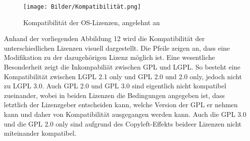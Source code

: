 \begin{figure}[h]
    \centering
    \texttt{[image: Bilder/Kompatibilität.png]}
    \caption{Kompatibilität der OS-Lizenzen, angelehnt an \cite[S. 65]{schaaf_open-source-lizenzen_2013}}
\end{figure}

Anhand der vorliegenden Abbildung 12 wird die Kompatibilität der unterschiedlichen Lizenzen visuell dargestellt. Die Pfeile zeigen an, dass eine Modifikation zu der dazugehörigen Lizenz möglich ist. Eine wesentliche Besonderheit zeigt die Inkompabiliät zwischen GPL und LGPL. So besteht eine Kompatibilität zwischen LGPL 2.1 only und GPL 2.0 und 2.0 only, jedoch nicht zu LGPL 3.0. Auch GPL 2.0 und GPL 3.0 sind eigentlich nicht kompatibel zueinander, wobei in beiden Lizenzen die Bedingungen angegeben ist, dass letztlich der Lizenzgeber entscheiden kann, welche Version der GPL er nehmen kann und daher von Kompatibilität ausgegangen werden kann. \cite[S. 65]{schaaf_open-source-lizenzen_2013} Auch die GPL 3.0 und die GPL 2.0 only sind aufgrund des Copyleft-Effekts beideer Lizenzen nicht miteinander kompatibel. 














